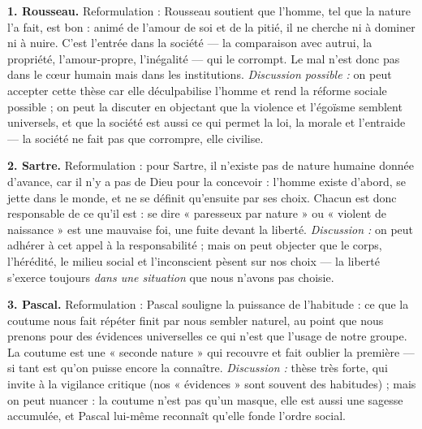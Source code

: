 \documentclass[11pt]{article}
\begin{document}
\begin{corrige}
\textbf{1. Rousseau.} Reformulation : Rousseau soutient que l'homme, tel que la nature l'a fait, est bon : animé de l'amour de soi et de la pitié, il ne cherche ni à dominer ni à nuire. C'est l'entrée dans la société — la comparaison avec autrui, la propriété, l'amour-propre, l'inégalité — qui le corrompt. Le mal n'est donc pas dans le cœur humain mais dans les institutions. \emph{Discussion possible :} on peut accepter cette thèse car elle déculpabilise l'homme et rend la réforme sociale possible ; on peut la discuter en objectant que la violence et l'égoïsme semblent universels, et que la société est aussi ce qui permet la loi, la morale et l'entraide — la société ne fait pas que corrompre, elle civilise.

\textbf{2. Sartre.} Reformulation : pour Sartre, il n'existe pas de nature humaine donnée d'avance, car il n'y a pas de Dieu pour la concevoir : l'homme existe d'abord, se jette dans le monde, et ne se définit qu'ensuite par ses choix. Chacun est donc responsable de ce qu'il est : se dire « paresseux par nature » ou « violent de naissance » est une mauvaise foi, une fuite devant la liberté. \emph{Discussion :} on peut adhérer à cet appel à la responsabilité ; mais on peut objecter que le corps, l'hérédité, le milieu social et l'inconscient pèsent sur nos choix — la liberté s'exerce toujours \emph{dans une situation} que nous n'avons pas choisie.

\textbf{3. Pascal.} Reformulation : Pascal souligne la puissance de l'habitude : ce que la coutume nous fait répéter finit par nous sembler naturel, au point que nous prenons pour des évidences universelles ce qui n'est que l'usage de notre groupe. La coutume est une « seconde nature » qui recouvre et fait oublier la première — si tant est qu'on puisse encore la connaître. \emph{Discussion :} thèse très forte, qui invite à la vigilance critique (nos « évidences » sont souvent des habitudes) ; mais on peut nuancer : la coutume n'est pas qu'un masque, elle est aussi une sagesse accumulée, et Pascal lui-même reconnaît qu'elle fonde l'ordre social.
\end{corrige}
\end{document}
